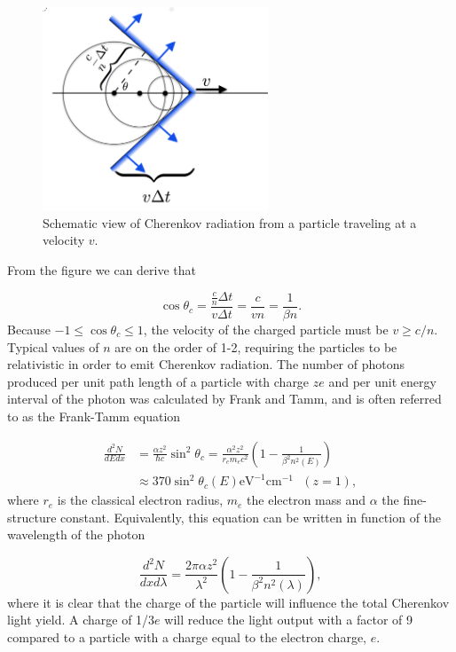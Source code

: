 \begin{figure}[t]
\centering
\includegraphics[width=0.6\textwidth]{chapter4/img/cherenkov2.png}
\caption{Schematic view of Cherenkov radiation from a particle traveling at a velocity $v$.}
\label{fig:cherenkov}
\end{figure}

\noindent From the figure we can derive that

\begin{equation}
\cos\theta_c = \frac{\frac{c}{n} \Delta t}{v \Delta t} = \frac{c}{vn} = \frac{1}{\beta n}.
\end{equation} 
Because $-1 \leq \cos\theta_c \leq 1$, the velocity of the charged particle must be $v \geq c/n$. Typical values of $n$ are on the order of 1-2, requiring the particles to be relativistic in order to emit Cherenkov radiation. The number of photons produced per unit path length of a particle with charge $ze$ and per unit energy interval of the photon was calculated by Frank and Tamm, and is often referred to as the Frank-Tamm equation \cite{PDG2018url}

\begin{equation}
\begin{split}
\frac{d^2N}{dE dx} &= \frac{\alpha z^2}{\hbar c} \sin^2 \theta_c = \frac{\alpha^2 z^2}{r_e m_e c^2} \left( 1 - \frac{1}{\beta^2 n^2\left(E\right)} \right)\\
&\approx 370 \sin^2 \theta_c \left(E\right) \textrm{eV}^{-1} \textrm{cm}^{-1} \ \ \ \left( z =1\right),
\end{split}
\end{equation}
where $r_e$ is the classical electron radius, $m_e$ the electron mass and $\alpha$ the fine-structure constant. Equivalently, this equation can be written in function of the wavelength of the photon

\begin{equation}
\label{eq:franktamm}
\frac{d^2N}{dx d\lambda}  = \frac{2\pi \alpha z^2}{\lambda^2} \left(1- \frac{1}{\beta^2 n^2 \left(\lambda \right)} \right),
\end{equation}
where it is clear that the charge of the particle will influence the total Cherenkov light yield. A charge of 1/3$e$ will reduce the light output with a factor of 9 compared to a particle with a charge equal to the electron charge, $e$.\\

